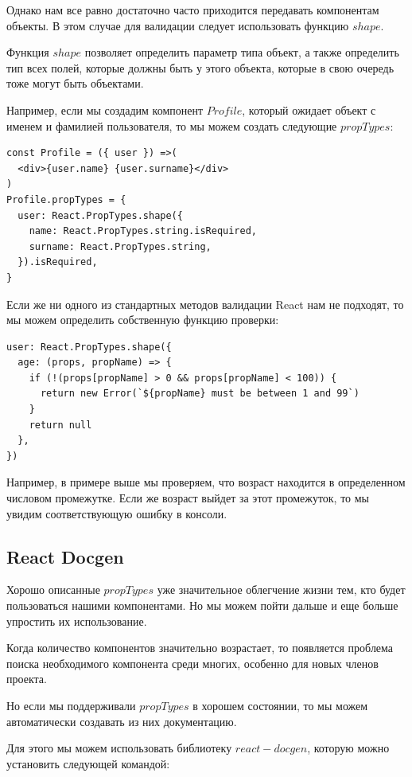 Однако нам все равно достаточно часто приходится передавать компонентам объекты. В этом случае для валидации следует использовать функцию $shape$.

Функция $shape$ позволяет определить параметр типа объект, а также определить тип всех полей, которые должны быть у этого объекта, которые в свою очередь тоже могут быть объектами.

Например, если мы создадим компонент $Profile$, который ожидает объект с именем и фамилией пользователя, то мы можем создать следующие $propTypes$:

\begin{lstlisting}
const Profile = ({ user }) =>(
  <div>{user.name} {user.surname}</div>
)
Profile.propTypes = {
  user: React.PropTypes.shape({
    name: React.PropTypes.string.isRequired,
    surname: React.PropTypes.string,
  }).isRequired,
}
\end{lstlisting}

Если же ни одного из стандартных методов валидации React нам не подходят, то мы можем определить собственную функцию проверки:

\begin{lstlisting}
user: React.PropTypes.shape({
  age: (props, propName) => {
    if (!(props[propName] > 0 && props[propName] < 100)) {
      return new Error(`${propName} must be between 1 and 99`)
    }
    return null
  },
})
\end{lstlisting}

Например, в примере выше мы проверяем, что возраст находится в определенном числовом промежутке. Если же возраст выйдет за этот промежуток, то мы увидим соответствующую ошибку в консоли.

\subsection*{React Docgen}

Хорошо описанные $propTypes$ уже значительное облегчение жизни тем, кто будет пользоваться нашими компонентами. Но мы можем пойти дальше и еще больше упростить их использование.

Когда количество компонентов значительно возрастает, то появляется проблема поиска необходимого компонента среди многих, особенно для новых членов проекта.

Но если мы поддерживали $propTypes$ в хорошем состоянии, то мы можем автоматически создавать из них документацию.

Для этого мы можем использовать библиотеку $react-docgen$, которую можно установить следующей командой:

